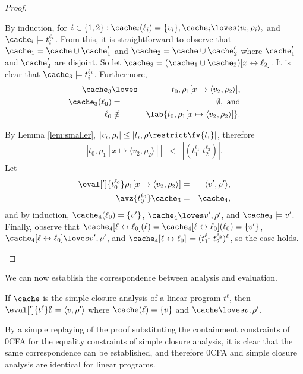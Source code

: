\begin{proof}
\begin{itemize}
By induction, for $i\in\{1,2\} : \cache_i(\ell_i) = \{v_i\},
\cache_i\loves\langle v_i,\rho_i\rangle,$ and $\cache_i\models
t_i^{\ell_i}$.  From this, it is straightforward to observe that
$\cache_1 = \cache \cup \cache'_1$ and $\cache_2 = \cache \cup
\cache'_2$ where $\cache'_1$ and $\cache'_2$ are disjoint.  So let
$\cache_3 = (\cache_1 \cup \cache_2)[x\leftrightarrow \ell_2]$.  It is
clear that $\cache_3\models t_i^{\ell_i}$.  Furthermore,
\begin{eqnarray*}
\cache_3 &\loves& t_0,\rho_1[x\mapsto \langle v_2,\rho_2\rangle],\\
\cache_3(\ell_0) &=& \emptyset,\mbox{ and}\\
\ell_0 &\notin& \lab{t_0,\rho_1[x\mapsto \langle v_2,\rho_2\rangle]}.
\end{eqnarray*}

By Lemma \ref{lem:smaller},
$|v_i,\rho_i| \leq |t_i,\rho\restrict\fv{t_i}|$, therefore 
\begin{eqnarray*}
|t_0,\rho_1[x\mapsto \langle v_2,\rho_2\rangle]| &<& |(t_1^{\ell_1}\;t_2^{\ell_2})|.
\end{eqnarray*}
Let
\begin{eqnarray*}
\eval[']{t_0^{\ell_0}}\rho_1[x\mapsto \langle v_2,\rho_2\rangle] &=& \langle v',\rho'\rangle,\\
\avz{t_0^{\ell_0}}\cache_3 &=& \cache_4,
\end{eqnarray*}
and by induction, $\cache_4(\ell_0) = \{v'\}$, $\cache_4\loves
v',\rho'$, and $\cache_4\models v'$.  Finally, observe that
$\cache_4[\ell\leftrightarrow\ell_0](\ell) =
\cache_4[\ell\leftrightarrow\ell_0](\ell_0) = \{v'\}$,
$\cache_4[\ell\leftrightarrow\ell_0]\loves v',\rho'$, and
$\cache_4[\ell\leftrightarrow\ell_0]\models
(t_1^{\ell_1}\;t_2^{\ell_2})^\ell$, so the case holds.
\end{itemize}
\end{proof}
We can now establish the correspondence between analysis and
evaluation.

\begin{corollary}\label{cor:normal}
If $\cache$ is the simple closure analysis of a linear program
$t^\ell$, then $\eval[']{t^\ell}\emptyset = \langle v,\rho'\rangle$ where
$\cache(\ell) = \{v\}$ and $\cache\loves v,\rho'$.
\end{corollary}

By a simple replaying of the proof substituting the containment
constraints of 0CFA for the equality constraints of simple closure
analysis, it is clear that the same correspondence can be established,
and therefore 0CFA and simple closure analysis are identical for
linear programs.

